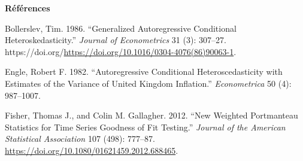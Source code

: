 \documentclass[
  ignorenonframetext,
]{beamer}
\newlength{\cslhangindent}
\newlength{\cslentryspacingunit} %
\newenvironment{CSLReferences}[2] %
 {%
  \setlength{\parindent}{0pt}
  \ifodd #1
  \let\oldpar\par
  \def\par{\hangindent=\cslhangindent\oldpar}
  \fi
  \setlength{\parskip}{#2\cslentryspacingunit}
 }%
 {}
\begin{document}
\begin{frame}
\textbf{Références}

\hypertarget{refs}{}
\begin{CSLReferences}{1}{0}
\leavevmode{}%
Bollerslev, Tim. 1986. {``Generalized Autoregressive Conditional
Heteroskedasticity.''} \emph{Journal of Econometrics} 31 (3): 307--27.
https://doi.org/\url{https://doi.org/10.1016/0304-4076(86)90063-1}.

\leavevmode{}%
Engle, Robert F. 1982. {``Autoregressive Conditional Heteroscedasticity
with Estimates of the Variance of United Kingdom Inflation.''}
\emph{Econometrica} 50 (4): 987--1007.

\leavevmode{}%
Fisher, Thomas J., and Colin M. Gallagher. 2012. {``New Weighted
Portmanteau Statistics for Time Series Goodness of Fit Testing.''}
\emph{Journal of the American Statistical Association} 107 (498):
777--87. \url{https://doi.org/10.1080/01621459.2012.688465}.

\end{CSLReferences}
\end{frame}
\end{document}
